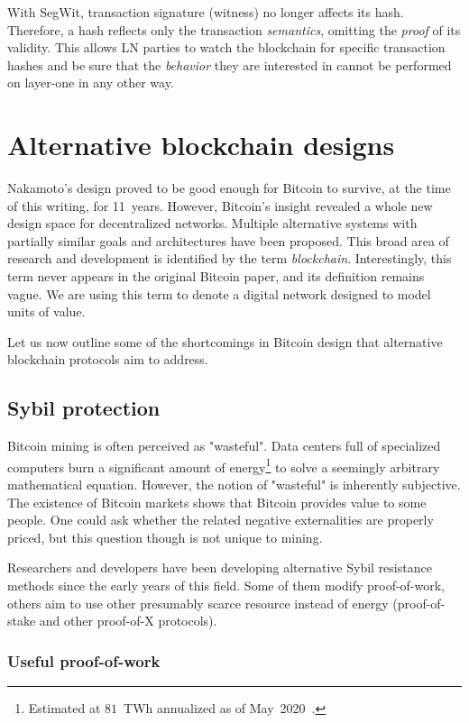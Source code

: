 With SegWit, transaction signature (witness) no longer affects its hash.
Therefore, a hash reflects only the transaction \textit{semantics}, omitting the \textit{proof} of its validity.
This allows LN parties to watch the blockchain for specific transaction hashes and be sure that the \textit{behavior} they are interested in cannot be performed on layer-one in any other way.



\section{Alternative blockchain designs}

Nakamoto's design proved to be good enough for Bitcoin to survive, at the time of this writing, for 11~years.
However, Bitcoin's insight revealed a whole new design space for decentralized networks.
Multiple alternative systems with partially similar goals and architectures have been proposed.
This broad area of research and development is identified by the term \textit{blockchain}.
Interestingly, this term never appears in the original Bitcoin paper, and its definition remains vague.
We are using this term to denote a digital network designed to model units of value.

Let us now outline some of the shortcomings in Bitcoin design that alternative blockchain protocols aim to address.


\subsection{Sybil protection}

Bitcoin mining is often perceived as "wasteful".
Data centers full of specialized computers burn a significant amount of energy\footnote{Estimated at $81$~TWh annualized as of May~2020~\cite{Rauchs2020}.} to solve a seemingly arbitrary mathematical equation.
However, the notion of "wasteful" is inherently subjective.
The existence of Bitcoin markets shows that Bitcoin provides value to some people.
One could ask whether the related negative externalities are properly priced, but this question though is not unique to mining.

Researchers and developers have been developing alternative Sybil resistance methods since the early years of this field.
Some of them modify proof-of-work, others aim to use other presumably scarce resource instead of energy (proof-of-stake and other proof-of-X protocols).


\subsubsection*{Useful proof-of-work}

